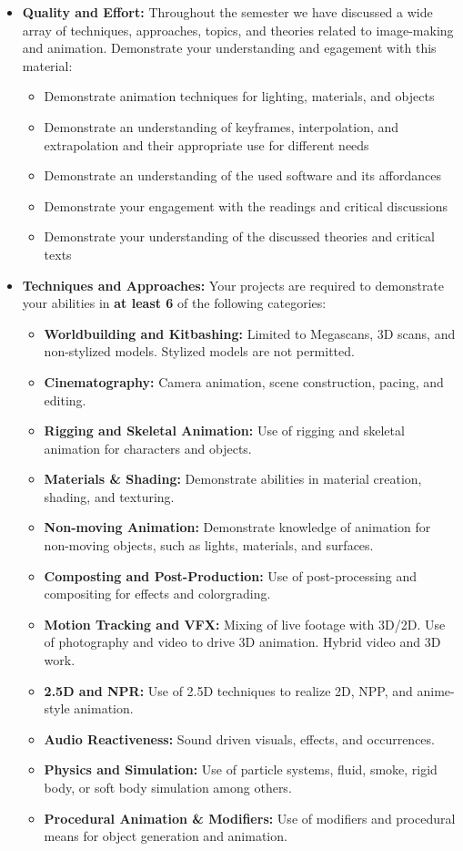 \begin{itemize}
	\item \textbf{Quality and Effort:} Throughout the semester we have discussed a wide array of techniques, approaches, topics, and theories related to image-making and animation. Demonstrate your understanding and egagement with this material:
	      \begin{itemize}
		      \item Demonstrate animation techniques for lighting, materials, and objects
		      \item Demonstrate an understanding of keyframes, interpolation, and extrapolation and their appropriate use for different needs
		      \item Demonstrate an understanding of the used software and its affordances
		      \item Demonstrate your engagement with the readings and critical discussions
		      \item Demonstrate your understanding of the discussed theories and critical texts
	      \end{itemize}
	\item \textbf{Techniques and Approaches:} Your projects are required to demonstrate your abilities in \textbf{at least 6} of the following categories:
	      \begin{itemize}
		      \item \textbf{Worldbuilding and Kitbashing:} Limited to Megascans, 3D scans, and non-stylized models. Stylized models are not permitted.
		      \item \textbf{Cinematography:} Camera animation, scene construction, pacing, and editing.
		      \item \textbf{Rigging and Skeletal Animation:} Use of rigging and skeletal animation for characters and objects.
		      \item \textbf{Materials \& Shading:} Demonstrate abilities  in material creation, shading, and texturing.
		      \item \textbf{Non-moving Animation:} Demonstrate knowledge of animation for non-moving objects, such as lights, materials, and surfaces.
		      \item \textbf{Composting and Post-Production:} Use of post-processing and compositing for effects and colorgrading.
		      \item \textbf{Motion Tracking and VFX:} Mixing of live footage with 3D/2D. Use of photography and video to drive 3D animation. Hybrid video and 3D work.
		      \item \textbf{2.5D and NPR:} Use of 2.5D techniques to realize 2D, NPP, and anime-style animation.
		      \item \textbf{Audio Reactiveness:} Sound driven visuals, effects, and occurrences.
		      \item \textbf{Physics and Simulation:} Use of particle systems, fluid, smoke, rigid body, or soft body simulation among others.
		      \item \textbf{Procedural Animation \& Modifiers:} Use of modifiers and procedural means for object generation and animation.
	      \end{itemize}
\end{itemize}
